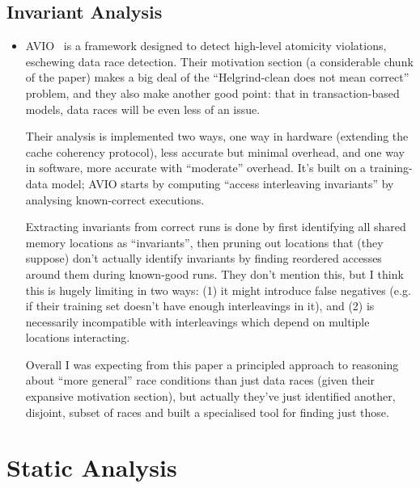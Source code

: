 \documentclass{article}
\begin{document}
\subsection{Invariant Analysis}
\begin{itemize}
	\item AVIO~\cite{avio} is a framework designed to detect high-level atomicity violations, eschewing data race detection. Their motivation section (a considerable chunk of the paper) makes a big deal of the ``Helgrind-clean does not mean correct'' problem, and they also make another good point: that in transaction-based models, data races will be even less of an issue.

	Their analysis is implemented two ways, one way in hardware (extending the cache coherency protocol), less accurate but minimal overhead, and one way in software, more accurate with ``moderate'' overhead. It's built on a training-data model; AVIO starts by computing ``access interleaving invariants'' by analysing known-correct executions.

	Extracting invariants from correct runs is done by first identifying all shared memory locations as ``invariants'', then pruning out locations that (they suppose) don't actually identify invariants by finding reordered accesses around them during known-good runs. They don't mention this, but I think this is hugely limiting in two ways: (1) it might introduce false negatives (e.g. if their training set doesn't have enough interleavings in it), and (2) is necessarily incompatible with interleavings which depend on multiple locations interacting.

	Overall I was expecting from this paper a principled approach to reasoning about ``more general'' race conditions than just data races (given their expansive motivation section), but actually they've just identified another, disjoint, subset of races and built a specialised tool for finding just those.
\end{itemize}

\section{Static Analysis}
\end{document}
